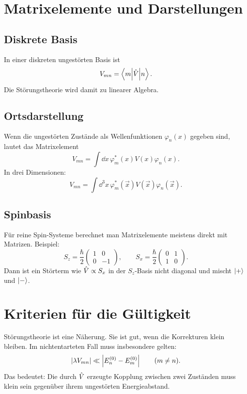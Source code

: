 \section{Matrixelemente und Darstellungen}

\subsection{Diskrete Basis}

In einer diskreten ungestörten Basis ist
\[
    V_{mn}=\left\langle m\middle|\hat V\middle|n\right\rangle.
\]
Die Störungstheorie wird damit zu linearer Algebra.

\subsection{Ortsdarstellung}

Wenn die ungestörten Zustände als Wellenfunktionen \(\varphi_n(x)\) gegeben sind, lautet das Matrixelement
\[
    V_{mn}=\int \dd x\, \varphi_m^*(x)V(x)\varphi_n(x).
\]
In drei Dimensionen:
\[
    V_{mn}=\int \dd^3x\, \varphi_m^*(\vec x)V(\vec x)\varphi_n(\vec x).
\]

\subsection{Spinbasis}

Für reine Spin-Systeme berechnet man Matrixelemente meistens direkt mit Matrizen. Beispiel:
\[
    S_z=\frac{\hbar}{2}\begin{pmatrix}1&0\\0&-1\end{pmatrix},
    \qquad
    S_x=\frac{\hbar}{2}\begin{pmatrix}0&1\\1&0\end{pmatrix}.
\]
Dann ist ein Störterm wie \(\hat V\propto S_x\) in der \(S_z\)-Basis nicht diagonal und mischt \(\left|+\right\rangle\) und \(\left|-\right\rangle\).

\section{Kriterien für die Gültigkeit}

Störungstheorie ist eine Näherung. Sie ist gut, wenn die Korrekturen klein bleiben. Im nichtentarteten Fall muss insbesondere gelten:
\[
    \left| \lambda V_{mn} \right|\ll \left| E_n^{(0)}-E_m^{(0)} \right|
    \qquad (m\neq n).
\]
Das bedeutet: Die durch \(\hat V\) erzeugte Kopplung zwischen zwei Zuständen muss klein sein gegenüber ihrem ungestörten Energieabstand.

